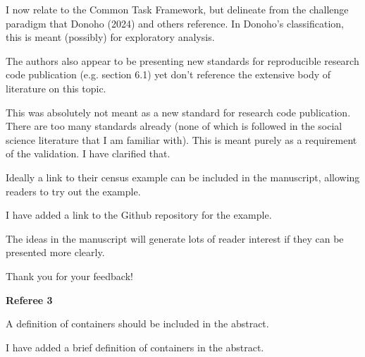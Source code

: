 \begin{response}
    I now relate to the Common Task Framework, but delineate from the challenge paradigm that Donoho (2024) and others reference. In Donoho's classification, this is meant (possibly) for exploratory analysis. 
\end{response}

\begin{referee}

The authors also appear to
be presenting new standards for reproducible research code publication (e.g. section 6.1) yet don't
reference the extensive body of literature on this topic. 

\end{referee}

\begin{response}
    This was absolutely not meant as a new standard for research code publication. There are too many standards already (none of which is followed in the social science literature that I am familiar with). This is meant purely as a requirement of the validation. I have clarified that.
\end{response}

\begin{referee}
    
Ideally a link to their census example can be
included in the manuscript, allowing readers to try out the example. 

\end{referee}

\begin{response}
    I have added a link to the Github repository for the example.
\end{response}


\begin{referee}
The ideas in the manuscript will
generate lots of reader interest if they can be presented more clearly.
\end{referee}

\begin{response}
    Thank you for your feedback!
\end{response}


\textbf{Referee 3}

\begin{referee}
    A definition of containers should be included in the abstract. 
\end{referee}

\begin{response}
    I have added a brief definition of containers in the abstract.
\end{response}



